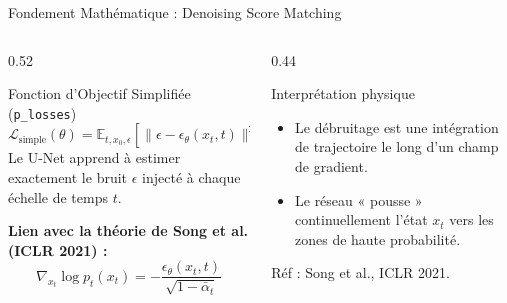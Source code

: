 \documentclass[aspectratio=169, 10pt, table]{beamer}
\begin{document}
\begin{frame}{Fondement Mathématique : Denoising Score Matching}
    \begin{columns}[T]
        \begin{column}{0.52\textwidth}
            \begin{block}{Fonction d'Objectif Simplifiée (\texttt{p\_losses})}
                \small
                $$\mathcal{L}_{\text{simple}}(\theta) = \mathbb{E}_{t, x_0, \epsilon} \left[ \| \epsilon - \epsilon_\theta(x_t, t) \|^2 \right]$$
                Le U-Net apprend à estimer exactement le bruit $\epsilon$ injecté à chaque échelle de temps $t$.
            \end{block}

            \vspace{0.15cm}
            \textbf{Lien avec la théorie de Song et al. (ICLR 2021) :}
            \small
            $$\nabla_{x_t} \log p_t(x_t) = - \frac{\epsilon_\theta(x_t, t)}{\sqrt{1 - \bar{\alpha}_t}}$$
        \end{column}

        \begin{column}{0.44\textwidth}
            \begin{alertblock}{Interprétation physique}
                \small
                \begin{itemize}
                    \item Le débruitage est une intégration de trajectoire le long d'un champ de gradient.
                    \item Le réseau « pousse » continuellement l'état $x_t$ vers les zones de haute probabilité.
                \end{itemize}
            \end{alertblock}
            \vspace{0.15cm}
            {\scriptsize Réf : Song et al., ICLR 2021.}
        \end{column}
    \end{columns}
\end{frame}
\end{document}

